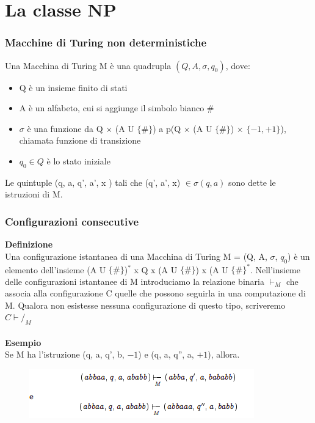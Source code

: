 \chapter{La classe NP} \label{ch:capitolo11}
\subsection{Macchine di Turing non deterministiche}
Una Macchina di Turing M è una quadrupla $(Q, A, \sigma, q_0)$, dove:
\begin{itemize}
    \item Q è un insieme finito di stati
    
    \item A è un alfabeto, cui si aggiunge il simbolo bianco \#
    
    \item $\sigma$ è una funzione da Q × (A U $\{\#\}$) a p(Q × (A U $\{\#\}$) × $\{-1, +1\}$), chiamata funzione di transizione
    
    \item $q_0 \in Q$ è lo stato iniziale
\end{itemize}
Le quintuple (q, a, q', a', x ) tali che (q', a', x) $\in \sigma(q, a)$ sono dette le istruzioni di M.
\subsection{Configurazioni consecutive}
\textbf{Definizione}\\
Una configurazione istantanea di una Macchina di Turing M = (Q, A, $\sigma$, $q_0$) è un elemento dell’insieme (A U $\{\#\}$)$^*$ x Q x (A U $\{\#\}$) x (A U $\{\#\}^*$.
Nell’insieme delle configurazioni istantanee di M introduciamo la relazione binaria $\vdash_M$ che associa alla configurazione C quelle che possono seguirla in una computazione di M. Qualora non esistesse nessuna configurazione di questo tipo, scriveremo $C\vdash/_M$\\\\
\textbf{Esempio}\\
Se M ha l’istruzione (q, a, q', b, $-1$) e (q, a, q'', a, $+1$), allora.\\
\begin{figure}[htp]
    \includegraphics[scale=0.9]{tesi_stile/img/foto1cap11.png}
\end{figure}

